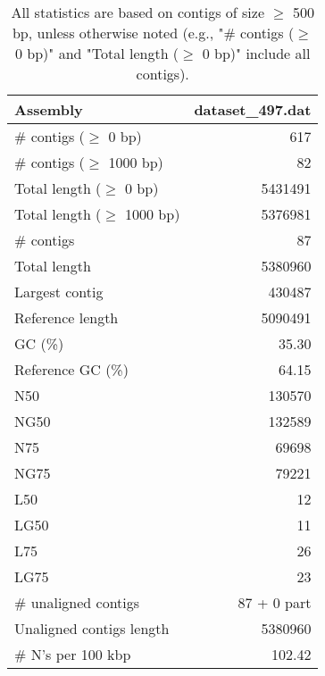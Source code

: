 \documentclass[12pt,a4paper]{article}
\begin{document}
\begin{table}[ht]
\begin{center}
\caption{All statistics are based on contigs of size $\geq$ 500 bp, unless otherwise noted (e.g., "\# contigs ($\geq$ 0 bp)" and "Total length ($\geq$ 0 bp)" include all contigs).}
\begin{tabular}{|l*{1}{|r}|}
\hline
Assembly & dataset\_497.dat \\ \hline
\# contigs ($\geq$ 0 bp) & 617 \\ \hline
\# contigs ($\geq$ 1000 bp) & 82 \\ \hline
Total length ($\geq$ 0 bp) & 5431491 \\ \hline
Total length ($\geq$ 1000 bp) & 5376981 \\ \hline
\# contigs & 87 \\ \hline
Total length & 5380960 \\ \hline
Largest contig & 430487 \\ \hline
Reference length & 5090491 \\ \hline
GC (\%) & 35.30 \\ \hline
Reference GC (\%) & 64.15 \\ \hline
N50 & 130570 \\ \hline
NG50 & 132589 \\ \hline
N75 & 69698 \\ \hline
NG75 & 79221 \\ \hline
L50 & 12 \\ \hline
LG50 & 11 \\ \hline
L75 & 26 \\ \hline
LG75 & 23 \\ \hline
\# unaligned contigs & 87 + 0 part \\ \hline
Unaligned contigs length & 5380960 \\ \hline
\# N's per 100 kbp & 102.42 \\ \hline
\end{tabular}
\end{center}
\end{table}
\end{document}
